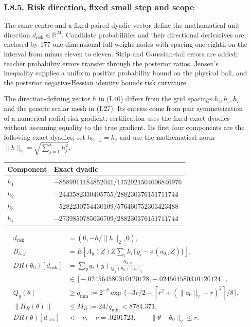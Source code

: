 \documentclass{article}
\begin{document}
\subsubsection*{I.8.5. Risk direction, fixed small step and
scope}\label{i.8.5.-risk-direction-fixed-small-step-and-scope}

The same centre and a fixed paired dyadic vector define the mathematical
unit direction \(d_{\mathrm{risk}}\in\mathbb R^{24}\). Candidate
probabilities and their directional derivatives are enclosed by 177
one-dimensional full-weight nodes with spacing one eighth on the
interval from minus eleven to eleven. Strip and Gaussian-tail errors are
added; teacher probability errors transfer through the posterior ratios.
Jensen's inequality supplies a uniform positive probability bound on the
physical ball, and the posterior negative-Hessian identity bounds risk
curvature.

The direction-defining vector \(h\) in (I.40) differs from the grid
spacings \(h_t,h_z,h_v\) and the generic scalar mesh in (I.27). Its
entries come from pair symmetrization of a numerical radial risk
gradient; certification uses the fixed exact dyadics without assuming
equality to the true gradient. Its first four components are the
following exact dyadics; set \(h_{9-j}=h_j\) and use the mathematical
norm \(\|h\|_2=\sqrt{\sum_{j=1}^8h_j^2}\).

\begin{longtable}[]{@{}ll@{}}
\toprule\noalign{}
Component & Exact dyadic \\
\midrule\noalign{}
\endhead
\bottomrule\noalign{}
\endlastfoot
\(h_1\) & \(-8589911184852041/1152921504606846976\) \\
\(h_2\) & \(-2443582330405755/288230376151711744\) \\
\(h_3\) & \(-5282230754430109/576460752303423488\) \\
\(h_4\) & \(-2739850785036709/288230376151711744\) \\
\end{longtable}

\[
\begin{aligned}
d_{\mathrm{risk}}&=(0,-h/\|h\|_2,0),\\
B_{h,y}&=E[A_y(Z)Z\sum_i h_i\{y_i-\sigma(a_{0,i}Z)\}],\\
DR(\theta_0)[d_{\mathrm{risk}}]&=\sum_yq_*(y)\frac{B_{h,y}}{Q_y(\theta_0)\|h\|_2}\\
&\in[-.024564580310120128,-.024564580310120124],\\
Q_y(\theta)&\ge q_{\min}:=2^{-8}
\exp\{-3r/2-[r^2+(\|a_0\|_2+r)^2]/8\},\\
\|H_R(\theta)\|&\le M_R:=24/q_{\min}<8784.371,\\
DR(\theta)[d_{\mathrm{risk}}]&<-\nu,\quad\nu=.0201723,\qquad\|\theta-\theta_0\|_2\le r.
\end{aligned}
\tag{I.40}
\]
\end{document}
